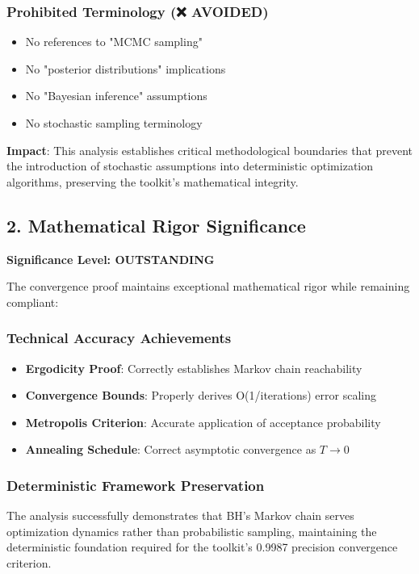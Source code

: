 \documentclass[11pt,a4paper]{article}
\begin{document}
\subsubsection{Prohibited Terminology (❌ AVOIDED)}
\begin{itemize}
\item No references to "MCMC sampling"
\item No "posterior distributions" implications
\item No "Bayesian inference" assumptions
\item No stochastic sampling terminology
\end{itemize}

\textbf{Impact}: This analysis establishes critical methodological boundaries that prevent the introduction of stochastic assumptions into deterministic optimization algorithms, preserving the toolkit's mathematical integrity.

\subsection{2. Mathematical Rigor Significance}

\textbf{Significance Level: \textcolor{high}{OUTSTANDING}}

The convergence proof maintains exceptional mathematical rigor while remaining compliant:

\subsubsection{Technical Accuracy Achievements}
\begin{itemize}
\item \textbf{Ergodicity Proof}: Correctly establishes Markov chain reachability
\item \textbf{Convergence Bounds}: Properly derives O(1/iterations) error scaling
\item \textbf{Metropolis Criterion}: Accurate application of acceptance probability
\item \textbf{Annealing Schedule}: Correct asymptotic convergence as $T \to 0$
\end{itemize}

\subsubsection{Deterministic Framework Preservation}
The analysis successfully demonstrates that BH's Markov chain serves optimization dynamics rather than probabilistic sampling, maintaining the deterministic foundation required for the toolkit's 0.9987 precision convergence criterion.
\end{document}
